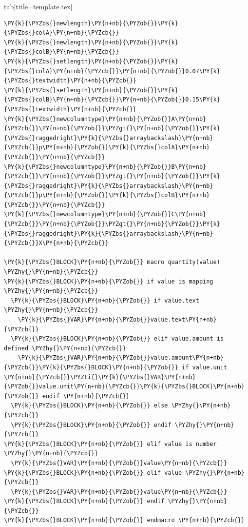 \documentclass[a4paper,twoside]{article}
\begin{document}
\begin{tsdiv}{tab}[title=template.tex]
\begin{tscode}[lang=tex, engine=pygments]
\begin{Verbatim}[commandchars=\\\{\},breaklines, breakanywhere, commandchars=\\\{\}]
\PY{k}{\PYZbs{}newlength}\PY{n+nb}{\PYZob{}}\PY{k}{\PYZbs{}colA}\PY{n+nb}{\PYZcb{}}
\PY{k}{\PYZbs{}newlength}\PY{n+nb}{\PYZob{}}\PY{k}{\PYZbs{}colB}\PY{n+nb}{\PYZcb{}}
\PY{k}{\PYZbs{}setlength}\PY{n+nb}{\PYZob{}}\PY{k}{\PYZbs{}colA}\PY{n+nb}{\PYZcb{}}\PY{n+nb}{\PYZob{}}0.07\PY{k}{\PYZbs{}textwidth}\PY{n+nb}{\PYZcb{}}
\PY{k}{\PYZbs{}setlength}\PY{n+nb}{\PYZob{}}\PY{k}{\PYZbs{}colB}\PY{n+nb}{\PYZcb{}}\PY{n+nb}{\PYZob{}}0.15\PY{k}{\PYZbs{}textwidth}\PY{n+nb}{\PYZcb{}}
\PY{k}{\PYZbs{}newcolumntype}\PY{n+nb}{\PYZob{}}A\PY{n+nb}{\PYZcb{}}\PY{n+nb}{\PYZob{}}\PYZgt{}\PY{n+nb}{\PYZob{}}\PY{k}{\PYZbs{}raggedright}\PY{k}{\PYZbs{}arraybackslash}\PY{n+nb}{\PYZcb{}}p\PY{n+nb}{\PYZob{}}\PY{k}{\PYZbs{}colA}\PY{n+nb}{\PYZcb{}}\PY{n+nb}{\PYZcb{}}
\PY{k}{\PYZbs{}newcolumntype}\PY{n+nb}{\PYZob{}}B\PY{n+nb}{\PYZcb{}}\PY{n+nb}{\PYZob{}}\PYZgt{}\PY{n+nb}{\PYZob{}}\PY{k}{\PYZbs{}raggedright}\PY{k}{\PYZbs{}arraybackslash}\PY{n+nb}{\PYZcb{}}p\PY{n+nb}{\PYZob{}}\PY{k}{\PYZbs{}colB}\PY{n+nb}{\PYZcb{}}\PY{n+nb}{\PYZcb{}}
\PY{k}{\PYZbs{}newcolumntype}\PY{n+nb}{\PYZob{}}C\PY{n+nb}{\PYZcb{}}\PY{n+nb}{\PYZob{}}\PYZgt{}\PY{n+nb}{\PYZob{}}\PY{k}{\PYZbs{}raggedright}\PY{k}{\PYZbs{}arraybackslash}\PY{n+nb}{\PYZcb{}}X\PY{n+nb}{\PYZcb{}}

\PY{k}{\PYZbs{}BLOCK}\PY{n+nb}{\PYZob{}} macro quantity(value) \PYZhy{}\PY{n+nb}{\PYZcb{}}
\PY{k}{\PYZbs{}BLOCK}\PY{n+nb}{\PYZob{}} if value is mapping \PYZhy{}\PY{n+nb}{\PYZcb{}}
  \PY{k}{\PYZbs{}BLOCK}\PY{n+nb}{\PYZob{}} if value.text \PYZhy{}\PY{n+nb}{\PYZcb{}}
    \PY{k}{\PYZbs{}VAR}\PY{n+nb}{\PYZob{}}value.text\PY{n+nb}{\PYZcb{}}
  \PY{k}{\PYZbs{}BLOCK}\PY{n+nb}{\PYZob{}} elif value.amount is defined \PYZhy{}\PY{n+nb}{\PYZcb{}}
    \PY{k}{\PYZbs{}VAR}\PY{n+nb}{\PYZob{}}value.amount\PY{n+nb}{\PYZcb{}}\PY{k}{\PYZbs{}BLOCK}\PY{n+nb}{\PYZob{}} if value.unit \PY{n+nb}{\PYZcb{}}\PYZti{}\PY{k}{\PYZbs{}VAR}\PY{n+nb}{\PYZob{}}value.unit\PY{n+nb}{\PYZcb{}}\PY{k}{\PYZbs{}BLOCK}\PY{n+nb}{\PYZob{}} endif \PY{n+nb}{\PYZcb{}}
  \PY{k}{\PYZbs{}BLOCK}\PY{n+nb}{\PYZob{}} else \PYZhy{}\PY{n+nb}{\PYZcb{}}
  \PY{k}{\PYZbs{}BLOCK}\PY{n+nb}{\PYZob{}} endif \PYZhy{}\PY{n+nb}{\PYZcb{}}
\PY{k}{\PYZbs{}BLOCK}\PY{n+nb}{\PYZob{}} elif value is number \PYZhy{}\PY{n+nb}{\PYZcb{}}
  \PY{k}{\PYZbs{}VAR}\PY{n+nb}{\PYZob{}}value\PY{n+nb}{\PYZcb{}}
\PY{k}{\PYZbs{}BLOCK}\PY{n+nb}{\PYZob{}} elif value \PYZhy{}\PY{n+nb}{\PYZcb{}}
  \PY{k}{\PYZbs{}VAR}\PY{n+nb}{\PYZob{}}value\PY{n+nb}{\PYZcb{}}
\PY{k}{\PYZbs{}BLOCK}\PY{n+nb}{\PYZob{}} endif \PYZhy{}\PY{n+nb}{\PYZcb{}}
\PY{k}{\PYZbs{}BLOCK}\PY{n+nb}{\PYZob{}} endmacro \PY{n+nb}{\PYZcb{}}


\end{Verbatim}
\end{tscode}
\end{tsdiv}
\end{document}
